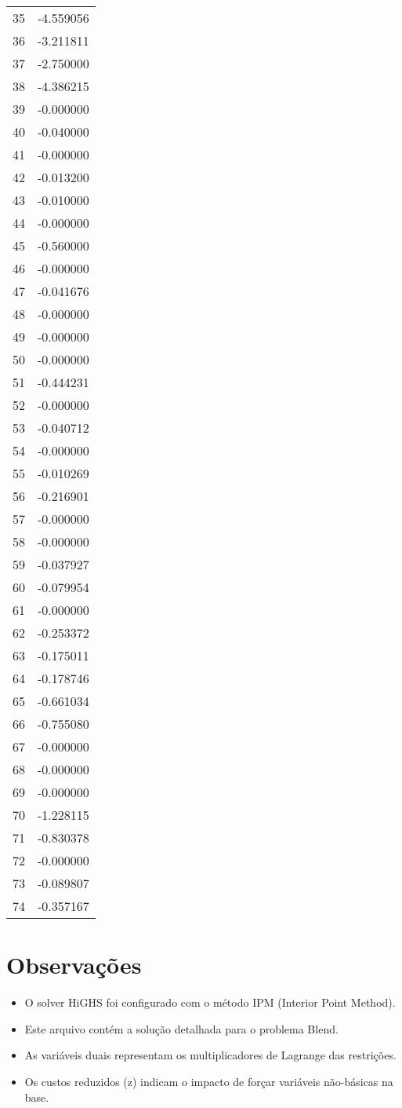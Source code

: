 \documentclass[12pt]{article}
\begin{document}
\begin{longtable}{@{}cc@{}}
35 & -4.559056 \\
36 & -3.211811 \\
37 & -2.750000 \\
38 & -4.386215 \\
39 & -0.000000 \\
40 & -0.040000 \\
41 & -0.000000 \\
42 & -0.013200 \\
43 & -0.010000 \\
44 & -0.000000 \\
45 & -0.560000 \\
46 & -0.000000 \\
47 & -0.041676 \\
48 & -0.000000 \\
49 & -0.000000 \\
50 & -0.000000 \\
51 & -0.444231 \\
52 & -0.000000 \\
53 & -0.040712 \\
54 & -0.000000 \\
55 & -0.010269 \\
56 & -0.216901 \\
57 & -0.000000 \\
58 & -0.000000 \\
59 & -0.037927 \\
60 & -0.079954 \\
61 & -0.000000 \\
62 & -0.253372 \\
63 & -0.175011 \\
64 & -0.178746 \\
65 & -0.661034 \\
66 & -0.755080 \\
67 & -0.000000 \\
68 & -0.000000 \\
69 & -0.000000 \\
70 & -1.228115 \\
71 & -0.830378 \\
72 & -0.000000 \\
73 & -0.089807 \\
74 & -0.357167 \\

\end{longtable}


\section{Observações}

\begin{itemize}
\item O solver HiGHS foi configurado com o método IPM (Interior Point Method).
\item Este arquivo contém a solução detalhada para o problema Blend.
\item As variáveis duais representam os multiplicadores de Lagrange das restrições.
\item Os custos reduzidos (z) indicam o impacto de forçar variáveis não-básicas na base.
\end{itemize}
\end{document}
